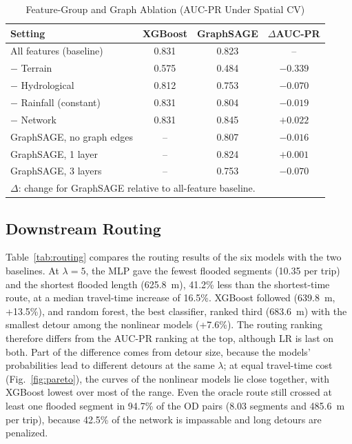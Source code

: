 \begin{table}[!t]
  \caption{Feature-Group and Graph Ablation (AUC-PR Under Spatial CV)}
  \label{tab:ablation}
  \centering
  \footnotesize
  \setlength{\tabcolsep}{4pt}
  \begin{tabular}{lccc}
    \toprule
    Setting & XGBoost & GraphSAGE & $\Delta$AUC-PR \\
    \midrule
    All features (baseline)   & 0.831 & 0.823 & -- \\
    $-$ Terrain               & 0.575 & 0.484 & $-0.339$ \\
    $-$ Hydrological          & 0.812 & 0.753 & $-0.070$ \\
    $-$ Rainfall (constant)   & 0.831 & 0.804 & $-0.019$ \\
    $-$ Network               & 0.831 & 0.845 & $+0.022$ \\
    \midrule
    GraphSAGE, no graph edges & --    & 0.807 & $-0.016$ \\
    GraphSAGE, 1 layer        & --    & 0.824 & $+0.001$ \\
    GraphSAGE, 3 layers       & --    & 0.753 & $-0.070$ \\
    \bottomrule
    \multicolumn{4}{l}{\scriptsize $\Delta$: change for GraphSAGE relative to all-feature baseline.}
  \end{tabular}
\end{table}

\subsection{Downstream Routing}
Table~\ref{tab:routing} compares the routing results of the six models with the two baselines. At $\lambda=5$, the MLP gave the fewest flooded segments (10.35 per trip) and the shortest flooded length (625.8~m), 41.2\% less than the shortest-time route, at a median travel-time increase of 16.5\%. XGBoost followed (639.8~m, +13.5\%), and random forest, the best classifier, ranked third (683.6~m) with the smallest detour among the nonlinear models (+7.6\%). The routing ranking therefore differs from the AUC-PR ranking at the top, although LR is last on both. Part of the difference comes from detour size, because the models' probabilities lead to different detours at the same $\lambda$; at equal travel-time cost (Fig.~\ref{fig:pareto}), the curves of the nonlinear models lie close together, with XGBoost lowest over most of the range. Even the oracle route still crossed at least one flooded segment in 94.7\% of the OD pairs (8.03 segments and 485.6~m per trip), because 42.5\% of the network is impassable and long detours are penalized.

